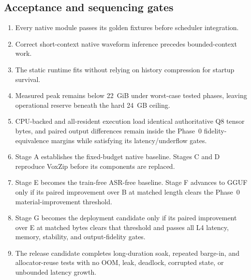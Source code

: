 \documentclass[10pt,letterpaper]{article}
\begin{document}
\subsection{Acceptance and sequencing gates}
\begin{enumerate}
    \item Every native module passes its golden fixtures before scheduler integration.
    \item Correct short-context native waveform inference precedes bounded-context work.
    \item The static runtime fits without relying on history compression for startup survival.
    \item Measured peak remains below 22~GiB under worst-case tested phases, leaving operational reserve beneath the hard 24~GB ceiling.
    \item CPU-backed and all-resident execution load identical authoritative Q8 tensor bytes, and paired output differences remain inside the Phase~0 fidelity-equivalence margins while satisfying its latency/underflow gates.
    \item Stage A establishes the fixed-budget native baseline. Stages C and D reproduce VoxZip before its components are replaced.
    \item Stage E becomes the train-free ASR-free baseline. Stage F advances to GGUF only if its paired improvement over B at matched length clears the Phase~0 material-improvement threshold.
    \item Stage G becomes the deployment candidate only if its paired improvement over E at matched bytes clears that threshold and passes all L4 latency, memory, stability, and output-fidelity gates.
    \item The release candidate completes long-duration soak, repeated barge-in, and allocator-reuse tests with no OOM, leak, deadlock, corrupted state, or unbounded latency growth.
\end{enumerate}
\end{document}
